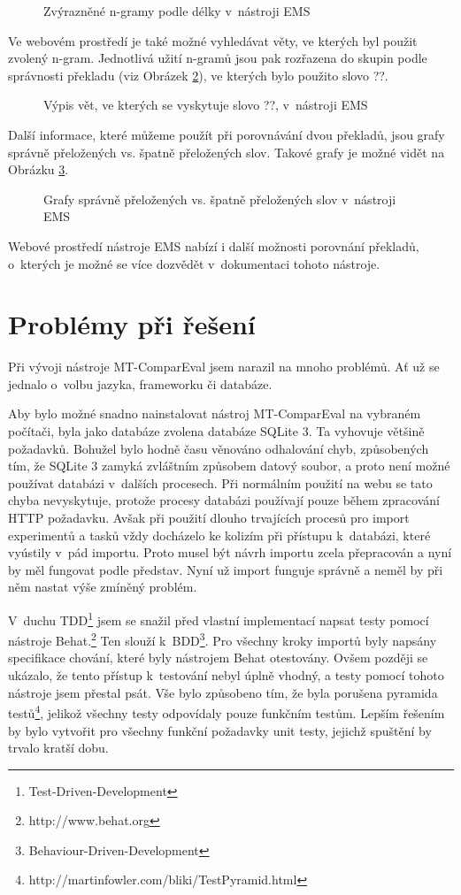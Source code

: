 \begin{figure}
  \caption{Zvýrazněné \mbox{n-gramy} podle délky v~nástroji EMS}
  \label{img:ems-sentence}
\end{figure}

Ve webovém prostředí je také možné vyhledávat věty,
  ve kterých byl použit zvolený \mbox{n-gram}.
Jednotlivá užití \mbox{n-gramů} jsou pak rozřazena do skupin podle správnosti překladu (viz Obrázek \ref{img:ems-word}),
  ve kterých bylo použito slovo ??.

\begin{figure}
  \caption{Výpis vět, ve kterých se vyskytuje slovo ??, v~nástroji EMS}
  \label{img:ems-word}
\end{figure}

Další informace, které můžeme použít při porovnávání dvou překladů,
  jsou grafy správně přeložených vs. špatně přeložených slov.
Takové grafy je možné vidět na Obrázku \ref{img:ems-charts}.

\begin{figure}
  \caption{Grafy správně přeložených vs. špatně přeložených slov v~nástroji EMS}
  \label{img:ems-charts}
\end{figure}

Webové prostředí nástroje EMS nabízí i další možnosti porovnání překladů,
  o~kterých je možné se více dozvědět v~dokumentaci tohoto nástroje.

\section{Problémy při řešení}
Při vývoji nástroje \mbox{MT-ComparEval} jsem narazil na mnoho problémů.
Ať už se jednalo o~volbu jazyka, frameworku či databáze.

Aby bylo možné snadno nainstalovat nástroj \mbox{MT-ComparEval} na vybraném počítači,
  byla jako databáze zvolena databáze SQLite 3.
Ta vyhovuje většině požadavků.
Bohužel bylo hodně času věnováno odhalování chyb,
  způsobených tím,
  že SQLite 3 zamyká zvláštním způsobem datový soubor,
  a proto není možné používat databázi v~dalších procesech.
Při normálním použití na webu se tato chyba nevyskytuje,
  protože procesy databázi používají pouze během zpracování HTTP požadavku.
Avšak při použití dlouho trvajících procesů pro import experimentů a tasků
  vždy docházelo ke kolizím při přístupu k~databázi,
  které vyústily v~pád importu.
Proto musel být návrh importu zcela přepracován a nyní by měl fungovat podle představ.
Nyní už import funguje správně a neměl by při něm nastat výše zmíněný problém.

V~duchu TDD\footnote{Test-Driven-Development}
  jsem se snažil před vlastní implementací napsat testy pomocí nástroje Behat.\footnote{http://www.behat.org}
Ten slouží k~BDD\footnote{Behaviour-Driven-Development}.
Pro všechny kroky importů byly napsány specifikace chování, které byly nástrojem Behat otestovány.
Ovšem později se ukázalo, že tento přístup k~testování nebyl úplně vhodný, a testy pomocí tohoto nástroje jsem přestal psát.
Vše bylo způsobeno tím, že byla porušena pyramida testů\footnote{http://martinfowler.com/bliki/TestPyramid.html},
  jelikož všechny testy odpovídaly pouze funkčním testům.
Lepším řešením by bylo vytvořit pro všechny funkční požadavky unit testy,
  jejichž spuštění by trvalo kratší dobu.
